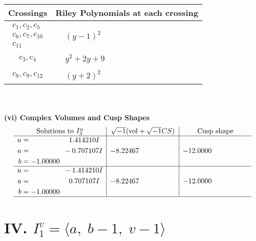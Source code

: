 \documentclass[1p]{elsarticle_modified}
\theoremstyle{definition}
\newcommand{\I}{\sqrt{-1}}
\begin{document}
\begin{tabular}{m{50pt}|m{274pt}}
Crossings & \hspace{64pt}Riley Polynomials at each crossing \\
\hline $$\begin{aligned}c_{1},c_{2},c_{5}\\c_{6},c_{7},c_{10}\\c_{11}\end{aligned}$$&$\begin{aligned}
&(y-1)^2
\end{aligned}$\\
\hline $$\begin{aligned}c_{3},c_{4}\end{aligned}$$&$\begin{aligned}
&y^2+2 y+9
\end{aligned}$\\
\hline $$\begin{aligned}c_{8},c_{9},c_{12}\end{aligned}$$&$\begin{aligned}
&(y+2)^2
\end{aligned}$\\
\hline
\end{tabular}\\~\\
\newpage\flushleft \textbf{(vi) Complex Volumes and Cusp Shapes}
$$\begin{array}{c|c|c}  
\text{Solutions to }I^u_{3}& \I (\text{vol} + \sqrt{-1}CS) & \text{Cusp shape}\\
 \hline 
\begin{aligned}
u &= \phantom{-0.000000 -}1.414210 I \\
a &= \phantom{-0.000000 } -0.707107 I \\
b &= -1.00000\phantom{ +0.000000I}\end{aligned}
 & -8.22467\phantom{ +0.000000I} & -12.0000\phantom{ +0.000000I} \\ \hline\begin{aligned}
u &= \phantom{-0.000000 } -1.414210 I \\
a &= \phantom{-0.000000 -}0.707107 I \\
b &= -1.00000\phantom{ +0.000000I}\end{aligned}
 & -8.22467\phantom{ +0.000000I} & -12.0000\phantom{ +0.000000I}\\
 \hline 
 \end{array}$$\newpage\newpage\renewcommand{\arraystretch}{1}
\centering \section*{IV. $I^v_{1}= \langle a,\;b-1,\;v-1 \rangle$}
\end{document}
